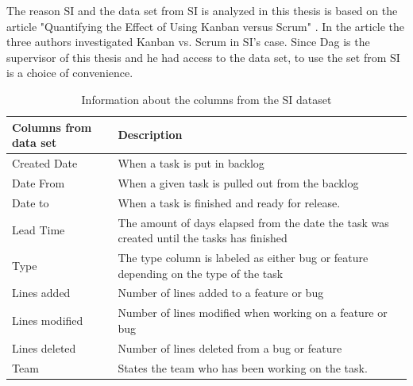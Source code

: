 \documentclass[UKenglish]{ifimaster}  %
\begin{document}
The reason SI and the data set from SI is analyzed in this thesis is based on the article "Quantifying the Effect of Using Kanban versus Scrum" \parencite{Dag}. In the article the three authors investigated Kanban vs. Scrum in SI's case. Since Dag is the supervisor of this thesis and he had access to the data set, to use the set from SI is a choice of convenience. 

\begin{table}[!ht]
\begin{center}
    \begin{tabular}{| l | p{5cm} |}
    \hline
     Columns from data set & Description\\ \hline
     Created Date & When a task is put in backlog \\ \hline
     Date From & When a given task is pulled out from the backlog\\ \hline
     Date to & When a task is finished and ready for release. \\ \hline
    Lead Time & The amount of days elapsed from the date the task was created until the tasks has finished  \\ \hline
   Type & The type column is labeled as either bug or feature depending on the type of the task \\ \hline
   Lines added & Number of lines added to a feature or bug \\ \hline
   Lines modified & Number of lines modified when working on a feature or bug \\ \hline
   Lines deleted & Number of lines deleted from a bug or feature \\
    \hline
    Team &States the team who has been working on the task.\\ \hline
    \end{tabular}
\caption{Information about the columns from the SI dataset}
\label{IC} %
\end{center}
\end{table}

\newpage
\end{document}
